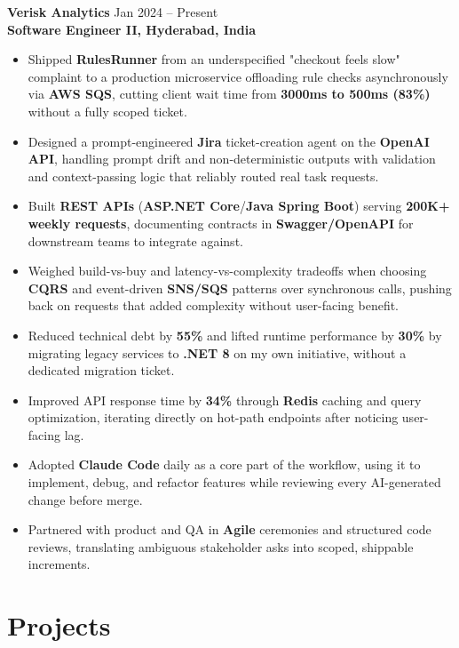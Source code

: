 \documentclass[a4paper,10pt]{article}
\begin{document}
\textbf{Verisk Analytics} \hfill Jan 2024 -- Present \\
\textbf{Software Engineer II, Hyderabad, India}

\begin{itemize}[leftmargin=*]
    \item Shipped \textbf{RulesRunner} from an underspecified "checkout feels slow" complaint to a production microservice offloading rule checks asynchronously via \textbf{AWS SQS}, cutting client wait time from \textbf{3000ms to 500ms (83\%)} without a fully scoped ticket.
    \item Designed a prompt-engineered \textbf{Jira} ticket-creation agent on the \textbf{OpenAI API}, handling prompt drift and non-deterministic outputs with validation and context-passing logic that reliably routed real task requests.
    \item Built \textbf{REST APIs} (\textbf{ASP.NET Core}/\textbf{Java Spring Boot}) serving \textbf{200K+ weekly requests}, documenting contracts in \textbf{Swagger/OpenAPI} for downstream teams to integrate against.
    \item Weighed build-vs-buy and latency-vs-complexity tradeoffs when choosing \textbf{CQRS} and event-driven \textbf{SNS/SQS} patterns over synchronous calls, pushing back on requests that added complexity without user-facing benefit.
    \item Reduced technical debt by \textbf{55\%} and lifted runtime performance by \textbf{30\%} by migrating legacy services to \textbf{.NET 8} on my own initiative, without a dedicated migration ticket.
    \item Improved API response time by \textbf{34\%} through \textbf{Redis} caching and query optimization, iterating directly on hot-path endpoints after noticing user-facing lag.
    \item Adopted \textbf{Claude Code} daily as a core part of the workflow, using it to implement, debug, and refactor features while reviewing every AI-generated change before merge.
    \item Partnered with product and QA in \textbf{Agile} ceremonies and structured code reviews, translating ambiguous stakeholder asks into scoped, shippable increments.
\end{itemize}

\section*{Projects}
\end{document}
